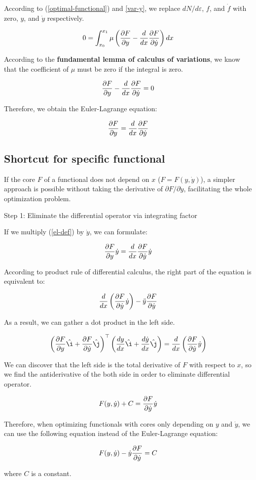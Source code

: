 According to (\ref{optimal-functional}) and \ref{var-y}, we replace
$dN/d\varepsilon$, $f$, and $\dot{f}$ with zero, $y$, and $\dot{y}$
respectively.

$$
0=\int_{x_0}^{x_1}\mu\left({\partial F\over\partial y}-{d\over dx}
{\partial F\over\partial\dot{y}}\right)dx
$$

According to the \textbf{fundamental lemma of calculus of variations}, we know
that the coefficient of $\mu$ must be zero if the integral is zero.

$$
{\partial F\over\partial y}-{d\over dx}{\partial F\over\partial\dot{y}}=0
$$

Therefore, we obtain the Euler-Lagrange equation:

\begin{equation}
	{\partial F\over\partial y}={d\over dx}{\partial F\over\partial\dot{y}}
	\label{el-def}
\end{equation}

\subsection{Shortcut for specific functional}

If the core $F$ of a functional does not depend on $x$ ($F=F(y,\dot{y})$), a
simpler approach is possible without taking the derivative of $\partial
F/\partial\dot{y}$, facilitating the whole optimization problem.

\begin{flushleft}
	Step 1: Eliminate the differential operator via integrating factor
\end{flushleft}

If we multiply (\ref{el-def}) by $\dot{y}$, we can formulate:

$$
{\partial F\over\partial y}\dot{y}=
{d\over dx}{\partial F\over\partial\dot{y}}\dot{y}
$$

According to product rule of differential calculus, the right part of the
equation is equivalent to:

$$
{d\over dx}\left({\partial F\over\partial\dot{y}}\dot{y}\right)
-\ddot{y}{\partial F\over\partial\dot{y}}
$$

As a result, we can gather a dot product in the left side.

$$
\left({\partial F\over\partial y}\hat{\i}
+{\partial F\over\partial\dot{y}}\hat{\j}\right)^\top
\left({dy\over dx}\hat{\i}+{d\dot{y}\over dx}\hat{\j}\right)
={d\over dx}\left({\partial F\over\partial\dot{y}}\dot{y}\right)
$$

We can discover that the left side is the total derivative of $F$ with respect
to $x$, so we find the antiderivative of the both side in order to eliminate
differential operator.

$$
F(y,\dot{y})+C={\partial F\over\partial\dot{y}}\dot{y}
$$

Therefore, when optimizing functionals with cores only depending on $y$ and
$\dot{y}$, we can use the following equation instead of the Euler-Lagrange
equation:

$$
F(y,\dot{y})-\dot{y}{\partial F\over\partial\dot{y}}=C
$$

where $C$ is a constant.
